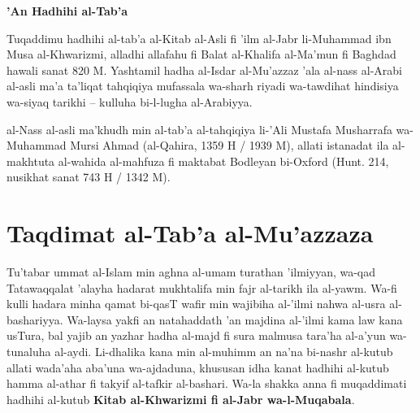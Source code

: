 \documentclass[11pt,a4paper]{book}
\begin{document}
\thispagestyle{empty}
\begin{center}
\vspace*{2cm}

{\Large\textbf{'An Hadhihi al-Tab'a}}

\vspace{1cm}

\begin{tcolorbox}[colback=arabicbg,colframe=rulecolor,arc=3pt,boxrule=0.5pt,width=0.88\textwidth]
\small
Tuqaddimu hadhihi al-tab'a al-Kitab al-Asli fi 'ilm al-Jabr li-Muhammad ibn
Musa al-Khwarizmi, alladhi allafahu fi Balat al-Khalifa al-Ma'mun fi Baghdad
hawali sanat 820 M. Yashtamil hadha al-Isdar al-Mu'azzaz 'ala al-nass al-Arabi
al-asli ma'a ta'liqat tahqiqiya mufassala wa-sharh riyadi wa-tawdihat
hindisiya wa-siyaq tarikhi -- kulluha bi-l-lugha al-Arabiyya.

\vspace{0.3cm}

al-Nass al-asli ma'khudh min al-tab'a al-tahqiqiya li-'Ali Mustafa Musharrafa
wa-Muhammad Mursi Ahmad (al-Qahira, 1359 H / 1939 M), allati istanadat ila
al-makhtuta al-wahida al-mahfuza fi maktabat Bodleyan bi-Oxford (Hunt. 214,
nusikhat sanat 743 H / 1342 M).
\end{tcolorbox}

\end{center}

\newpage

\tableofcontents
\newpage

\chapter*{Taqdimat al-Tab'a al-Mu'azzaza}

\begin{historicalbox}
Tu'tabar ummat al-Islam min aghna al-umam turathan 'ilmiyyan, wa-qad
 Tatawaqqalat 'alayha hadarat mukhtalifa min fajr al-tarikh ila al-yawm.
Wa-fi kulli hadara minha qamat bi-qasT wafir min wajibiha al-'ilmi nahwa
al-usra al-bashariyya. Wa-laysa yakfi an natahaddath 'an majdina al-'ilmi
kama law kana usTura, bal yajib an yazhar hadha al-majd fi sura
malmusa tara'ha al-a'yun wa-tunaluha al-aydi. Li-dhalika kana min
al-muhimm an na'na bi-nashr al-kutub allati wada'aha aba'una
wa-ajdaduna, khususan idha kanat hadhihi al-kutub hamma al-athar fi
takyif al-tafkir al-bashari. Wa-la shakka anna fi muqaddimati hadhihi
al-kutub \textbf{Kitab al-Khwarizmi fi al-Jabr wa-l-Muqabala}.
\end{historicalbox}
\end{document}

